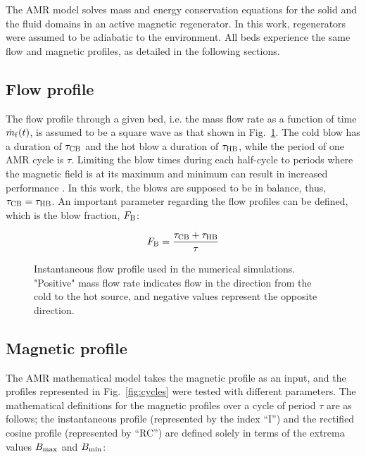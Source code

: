 \documentclass[draft]{svjour3}
\newcommand{\bmax}{\ensuremath{{B}\ped{max}}}
\newcommand{\bmin}{\ensuremath{{B}\ped{min}}}
\begin{document}
The AMR model solves mass and energy conservation equations for the solid and the fluid domains in an active magnetic regenerator. In this work, regenerators were assumed to be adiabatic to the environment. All beds experience the same flow and magnetic profiles, as detailed in the following sections.

\subsection{Flow profile}
\label{sec:flow-profile}


The flow profile through a given bed, i.e. the mass flow rate as a function of time $\dot{m}_{\mathrm{f}} (t)$, is assumed to be a square wave as that shown in Fig.~\ref{fig:mprofile}. The cold blow has a duration of $\tau_{\mathrm{CB}}$ and the  hot blow a duration of $\tau_{\mathrm{HB}}$, while the period of one AMR cycle is $\tau$. Limiting the blow times during each half-cycle to periods where the magnetic field is at its maximum and minimum can result in increased performance \cite{bib:nakashima17_avaliac}. In this work, the blows are supposed to be in balance, thus, $\tau_{\mathrm{CB}} = \tau_{\mathrm{HB}}$. An important parameter regarding the flow profiles can be defined, which is the blow fraction, $F_{\mathrm{B}}$:

\begin{equation}
  \label{eq:1}
  F_{\mathrm{B}} = \frac{\tau_{\mathrm{CB}} + \tau_{\mathrm{HB}}}{\tau}
\end{equation}

\begin{figure}[!ht]
  \centering
  \caption{Instantaneous flow profile used in the numerical simulations. "Positive" mass flow rate indicates flow in the direction from the cold to the hot source, and negative values represent the opposite direction. }
  \label{fig:mprofile}
\end{figure}

\subsection{Magnetic profile}
\label{sec:magnetic-profile}

The AMR mathematical model takes the magnetic profile as an input, and the profiles represented in Fig.~\ref{fig:cycles} were tested with different parameters. The mathematical definitions for the magnetic profiles over a cycle of period $\tau$ are as follows; the instantaneous profile (represented by the index ``I'') and the rectified cosine profile (represented by ``RC'') are defined solely in terms of the extrema values $\bmax$ and $\bmin$:
\end{document}
